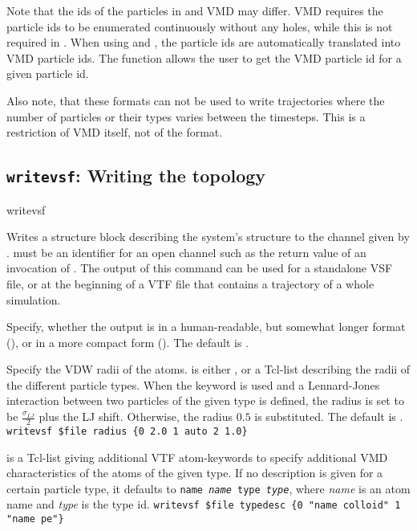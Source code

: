 Note that the ids of the particles in \es and VMD may differ. VMD
requires the particle ids to be enumerated continuously without any
holes, while this is not required in \es. When using 
and , the \es particle ids are automatically translated
into VMD particle ids. The function  allows the user to
get the VMD particle id for a given \es particle id.

Also note, that these formats can not be used to write trajectories
where the number of particles or their types varies between the
timesteps. This is a restriction of VMD itself, not of the format.

\subsection{\texttt{writevsf}: Writing the topology}

\begin{essyntax}
  writevsf  
\end{essyntax}
Writes a structure block describing the system's structure to the
channel given by .  must be an
identifier for an open channel such as the return value of an
invocation of .  The output of this command can be used
for a standalone VSF file, or at the beginning of a VTF file that
contains a trajectory of a whole simulation.

\begin{arguments}
\item[\opt{\alt{short \asep verbose}}]
  Specify, whether the output is in a human-readable, but somewhat
  longer format (), or in a more compact form
  (). The default is .
  
\item[\opt{radius \alt{\var{radii} \asep auto}}] Specify the VDW radii
  of the atoms.  is either , or a Tcl-list
  describing the radii of the different particle types. When the
  keyword  is used and a Lennard-Jones interaction
  between two particles of the given type is defined, the radius is
  set to be $\frac{\sigma_{LJ}}{2}$ plus the LJ shift.  Otherwise, the
  radius $0.5$ is substituted. The default is .
  \verb!writevsf $file radius {0 2.0 1 auto 2 1.0}!

\item[\opt{typedesc \var{typedesc}}]
   is a Tcl-list giving additional VTF atom-keywords to
  specify additional VMD characteristics of the atoms of the given type.
  If no description is given for a certain particle type, it defaults to
  \texttt{name \textit{name} type \textit{type}}, where \textit{name}
  is an atom name and \textit{type} is the type id.
  \verb!writevsf $file typedesc {0 "name colloid" 1 "name pe"}!
\end{arguments}

